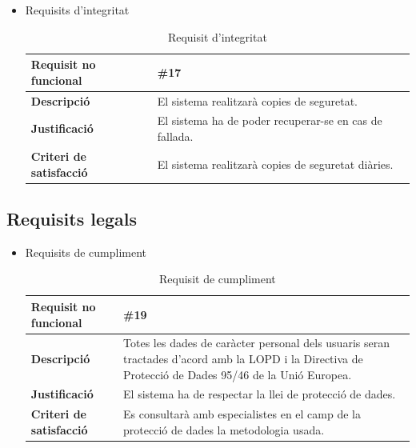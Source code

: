 \begin{itemize}
\item{Requisits d'integritat}
\begin{table}[!h]
\centering
\begin{tabular}{|l|M|}
\hline
\textbf{Requisit no funcional }& \#17  \\ \hline
\textbf{Descripció} &  El sistema realitzarà copies de seguretat.\\ \hline
\textbf{Justificació} &  El sistema ha de poder recuperar-se en cas de fallada. \\ \hline
\textbf{Criteri de satisfacció} &  El sistema realitzarà copies de seguretat diàries.\\ \hline
\end{tabular}
\label{}
\caption{Requisit d'integritat}
\end{table}




\end{itemize}


\subsection{Requisits legals}

\begin{itemize}
\item{Requisits de cumpliment}

\begin{table}[!h]
\centering
\begin{tabular}{|l|M|}
\hline
\textbf{Requisit no funcional }& \#19  \\ \hline
\textbf{Descripció} & Totes les dades de caràcter personal dels usuaris seran tractades d’acord amb la LOPD i la Directiva de
Protecció de Dades 95/46 de la Unió Europea.\\ \hline
\textbf{Justificació} & El sistema ha de respectar la llei de protecció de dades. \\ \hline
\textbf{Criteri de satisfacció} & Es consultarà amb especialistes en el camp de la protecció de dades la metodologia usada.
\\ \hline
\end{tabular}
\label{}
\caption{Requisit de cumpliment}
\end{table}

\end{itemize}

